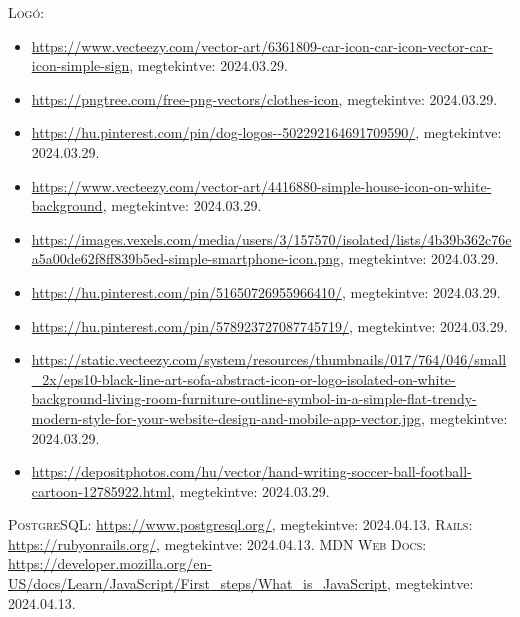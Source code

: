 \documentclass[]{thesis-ekf}
\theoremstyle{definition}
\theoremstyle{remark}
\begin{document}
\begin{thebibliography}{2}
		\textsc{Logó}:
			\begin{itemize}
				\item \url{https://www.vecteezy.com/vector-art/6361809-car-icon-car-icon-vector-car-icon-simple-sign},  megtekintve: 2024.03.29.
				\item \url{https://pngtree.com/free-png-vectors/clothes-icon}, megtekintve: 2024.03.29.
				\item \url{https://hu.pinterest.com/pin/dog-logos--502292164691709590/}, megtekintve: 2024.03.29.
				\item \url{https://www.vecteezy.com/vector-art/4416880-simple-house-icon-on-white-background}, megtekintve: 2024.03.29.
				\item \url{https://images.vexels.com/media/users/3/157570/isolated/lists/4b39b362c76ea5a00de62f8ff839b5ed-simple-smartphone-icon.png}, megtekintve: 2024.03.29.
				\item \url{https://hu.pinterest.com/pin/51650726955966410/}, megtekintve: 2024.03.29.
				\item \url{https://hu.pinterest.com/pin/578923727087745719/}, megtekintve: 2024.03.29.
				\item \url{https://static.vecteezy.com/system/resources/thumbnails/017/764/046/small_2x/eps10-black-line-art-sofa-abstract-icon-or-logo-isolated-on-white-background-living-room-furniture-outline-symbol-in-a-simple-flat-trendy-modern-style-for-your-website-design-and-mobile-app-vector.jpg}, megtekintve: 2024.03.29.
				\item \url{https://depositphotos.com/hu/vector/hand-writing-soccer-ball-football-cartoon-12785922.html}, megtekintve: 2024.03.29.
			
			\end{itemize}
		\textsc{PostgreSQL}: \url{https://www.postgresql.org/}, megtekintve: 2024.04.13.
		\textsc{Rails}: \url{https://rubyonrails.org/}, megtekintve: 2024.04.13.
		\textsc{MDN Web Docs}: \url{https://developer.mozilla.org/en-US/docs/Learn/JavaScript/First_steps/What_is_JavaScript}, megtekintve: 2024.04.13.
		
		
	\end{thebibliography}
	
	
\end{document}
